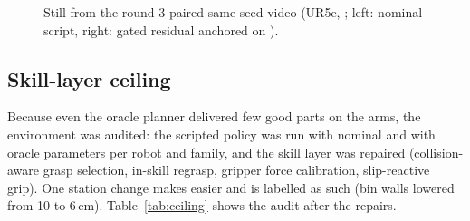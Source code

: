 \begin{figure}[!htbp]
  \centering
  \caption{Still from the round-3 paired same-seed video (UR5e, ; left: nominal script,
  right: gated residual anchored on \pta). }
  \label{fig:paired}
\end{figure}

\subsection{Skill-layer ceiling}
\label{sec:res-ceiling}

Because even the oracle planner delivered few good parts on the arms, the environment was audited: the scripted
policy was run with nominal and with oracle parameters per robot and family, and the skill layer was repaired
(collision-aware grasp selection, in-skill regrasp, gripper force calibration, slip-reactive grip). One station
change makes  easier and is labelled as such (bin walls lowered from 10 to 6\,cm).
Table~\ref{tab:ceiling} shows the audit after the repairs.

